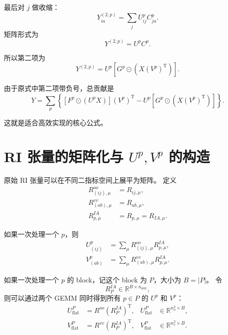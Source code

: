 \documentclass[UTF8,a4paper,11pt]{ctexart}
\newcommand{\Roo}{R^{oo}}
\newcommand{\Rvv}{R^{vv}}
\newcommand{\Ria}{R^{IA}}
\newcommand{\Had}{\odot}
\newcommand{\trans}{\mathrm{T}}
\begin{document}
最后对 $j$ 做收缩：
\begin{equation}
Y^{(2,p)}_{ia}
=
\sum_j U^p_{ij}C^p_{ja}.
\label{eq:Y2_contract}
\end{equation}
矩阵形式为
\begin{equation}
Y^{(2,p)}
=
U^p C^p.
\label{eq:Y2_mat}
\end{equation}

所以第二项为
\begin{equation}
\boxed{
Y^{(2,p)}
=
U^p
\left[
G^p\Had \left(X(V^p)^{\trans}\right)
\right]
}.
\label{eq:Y2_final}
\end{equation}

由于原式中第二项带负号，总贡献是
\begin{equation}
\boxed{
Y
=
\sum_p
\left\{
\left[
F^p\Had (U^pX)
\right]
(V^p)^{\trans}
-
U^p
\left[
G^p\Had \left(X(V^p)^{\trans}\right)
\right]
\right\}.
}
\label{eq:main_matrix_formula}
\end{equation}

这就是适合高效实现的核心公式。

\section{RI 张量的矩阵化与 $U^p,V^p$ 的构造}

原始 RI 张量可以在不同二指标空间上展平为矩阵。
定义
\begin{align}
\Roo_{(ij),\mu} &= R_{ij,\mu},
\\
\Rvv_{(ab),\mu} &= R_{ab,\mu},
\\
\Ria_{p,\mu} &= R_{p,\mu}=R_{IA,\mu}.
\end{align}

如果一次处理一个 $p$，则
\begin{align}
U^p_{(ij)}
&=
\sum_{\mu}
\Roo_{(ij),\mu}
\Ria_{p,\mu},
\\
V^p_{(ab)}
&=
\sum_{\mu}
\Rvv_{(ab),\mu}
\Ria_{p,\mu}.
\end{align}

如果一次处理一个 $p$ 的 block，记这个 block 为 $P$，大小为 $B=|P|$。
令
\begin{equation}
\Ria_P \in \mathbb{R}^{B\times n_{\mathrm{aux}}},
\end{equation}
则可以通过两个 GEMM 同时得到所有 $p\in P$ 的 $U^p$ 和 $V^p$：
\begin{align}
U_{\mathrm{flat}}^P
&=
\Roo(\Ria_P)^{\trans},
&
U_{\mathrm{flat}}^P
&\in \mathbb{R}^{n_o^2\times B},
\label{eq:U_gemm}
\\
V_{\mathrm{flat}}^P
&=
\Rvv(\Ria_P)^{\trans},
&
V_{\mathrm{flat}}^P
&\in \mathbb{R}^{n_v^2\times B}.
\label{eq:V_gemm}
\end{align}
\end{document}
